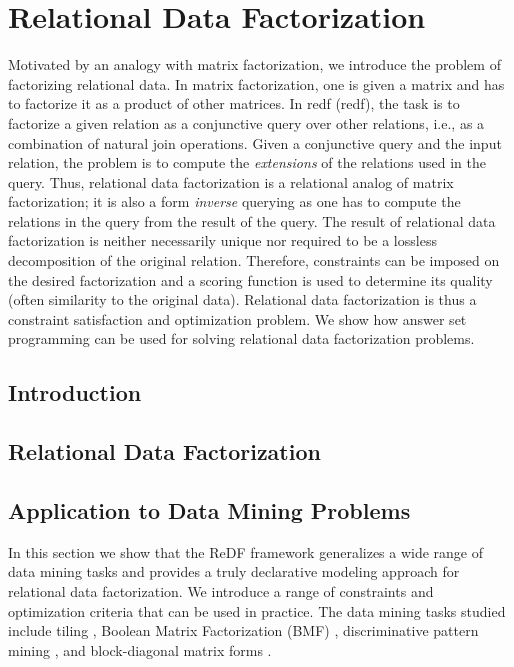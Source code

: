 \chapter{Relational Data Factorization}\label{ch:ReDF}
\newcommand{\redfpath}{chapters/ReDF/tex_files}


Motivated by an analogy with matrix factorization, we introduce the problem of factorizing relational data. In matrix factorization, one is given a matrix and has to factorize it as a product of other matrices. In \acrlong{redf} (\acrshort{redf}), the task is to factorize a given relation as a conjunctive query over other relations, i.e., as a combination of natural join operations. Given a conjunctive query and the input relation, the problem is to compute the \emph{extensions} of the relations used in the query. Thus, relational data factorization is a relational analog of matrix factorization; it is also a form {\em inverse} querying as one has to compute the relations in the query from the result of the query.  The result of relational data factorization is neither necessarily unique nor required to be a lossless decomposition of the original relation. Therefore, constraints can be imposed on the desired factorization and a scoring function is used to determine its quality (often similarity to the original data). Relational data factorization is thus a constraint satisfaction and optimization problem. We show how answer set programming can be used for solving relational data factorization problems. 


\section{Introduction}
 
\section{Relational Data Factorization}
\label{section:framework}


\section{Application to Data Mining Problems}
\label{section:dm_problems}

In this section we show that the ReDF framework generalizes a wide range of data mining tasks and provides a truly declarative modeling approach for relational data factorization. We introduce a range of constraints and optimization criteria that can be used in practice. The data mining tasks studied include tiling \parencite{tiling},  Boolean Matrix Factorization (BMF) \parencite{dbp}, discriminative pattern mining \parencite{DBLP:conf/pkdd/KnobbeH06}, and block-diagonal matrix forms \parencite{blockdiagonal}.%

